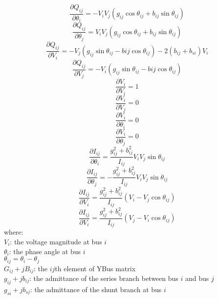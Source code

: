 \documentclass[12pt]{article}
\begin{document}
\begin{equation}
\frac{\partial Q_{ij}}{\partial \theta_i}  = -V_iV_j(g_{ij}\cos\theta_{ij} + b_{ij}\sin{\theta_{ij}})
\end{equation}
\begin{equation}
\frac{\partial Q_{ij}}{\partial \theta_j}  = V_iV_j(g_{ij}\cos\theta_{ij} + b_{ij}\sin{\theta_{ij}})
\end{equation}
\begin{equation}
\frac{\partial Q_{ij}}{\partial V_i}  =-V_j(g_{ij}\sin\theta_{ij}-b{ij}\cos{\theta_{ij}})-2(b_{ij}+b_{si})V_i
\end{equation}
\begin{equation}
\frac{\partial Q_{ij}}{\partial V_j}  =-V_i(g_{ij}\sin\theta_{ij}-b{ij}\cos{\theta_{ij}})
\end{equation}
\begin{equation}
\frac{\partial V_i}{\partial V_i}  = 1
\end{equation}
\begin{equation}
\frac{\partial V_i}{\partial V_j}  = 0
\end{equation}
\begin{equation}
\frac{\partial V_i}{\partial \theta_i}  = 0
\end{equation}
\begin{equation}
\frac{\partial V_i}{\partial \theta_j}  = 0
\end{equation}
\begin{equation}
\frac{\partial I_{ij}}{\partial \theta_i}  = \frac{g_{ij}^2+b_{ij}^2}{I_{ij}}V_iV_j\sin{\theta_{ij}} 
\end{equation}
\begin{equation}
\frac{\partial I_{ij}}{\partial \theta_j}  = -\frac{g_{ij}^2+b_{ij}^2}{I_{ij}}V_iV_j\sin{\theta_{ij}}
\end{equation}
\begin{equation}
\frac{\partial I_{ij}}{\partial V_i}  = \frac{g_{ij}^2+b_{ij}^2}{I_{ij}}(V_i-V_j\cos{\theta_{ij}})
\end{equation}
\begin{equation}
\frac{\partial I_{ij}}{\partial V_i}  = \frac{g_{ij}^2+b_{ij}^2}{I_{ij}}(V_j-V_i\cos{\theta_{ij}})
\end{equation}
where: \\
$V_i$: the voltage magnitude at bus $i$ \\
$\theta_i$: the phase angle at bus $i$ \\
$\theta_{ij} = \theta_i-\theta_j$ \\
$G_{ij}+jB_{ij}$: the $ij$th element of YBus matrix \\
$g_{ij}+jb_{ij}$: the admittance of the series branch between bus $i$ and bus $j$ \\
$g_{si}+jb_{sj}$: the admittance of the shunt branch at bus $i$ 
\end{document}
